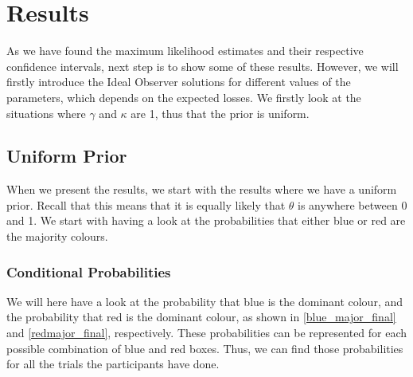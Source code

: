 \chapter{Results}

As we have found the maximum likelihood estimates and their respective confidence intervals, next step is to show some of these results. However, we will firstly introduce the Ideal Observer solutions for different values of the parameters, which depends on the expected losses. We firstly look at the situations where $\gamma$ and $\kappa$ are 1, thus that the prior is uniform. 

\section{Uniform Prior}
When we present the results, we start with the results where we have a uniform prior. Recall that this means that it is equally likely that $\theta$ is anywhere between 0 and 1. We start with having a look at the probabilities that either blue or red are the majority colours. 

\subsection{Conditional Probabilities}
We will here have a look at the probability that blue is the dominant colour, and the probability that red is the dominant colour, as shown in \eqref{blue_major_final} and \eqref{redmajor_final}, respectively. These probabilities can be represented for each possible combination of blue and red boxes. Thus, we can find those probabilities for all the trials the participants have done. 

